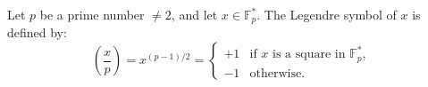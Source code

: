 Let $p$ be a prime number $\neq 2$, and let $x \in \mathbb{F}_p^*$. The Legendre symbol of $x$ is defined by:
$$\left(\frac{x}{p}\right) = x^{(p-1)/2} = \begin{cases} +1 & \text{if } x \text{ is a square in } \mathbb{F}_p^*, \\ -1 & \text{otherwise.} \end{cases}$$
